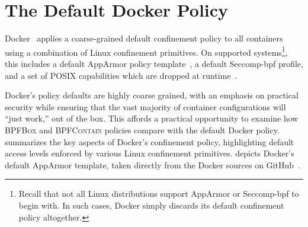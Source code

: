 \documentclass[
  fontsize=12pt,
  titlepage=firstiscover,
  paper=letter,
oneside,
  cleardoublepage=plain,
  parskip=half-,
  DIV=10,
  parindent,
  appendixprefix,
  chapterprefix,
  listof=totoc,
]{scrbook}
\newcommand{\bpfbox}{\textsc{BPFBox}}
\newcommand{\bpfcontain}{\textsc{BPFContain}}
\begin{document}
\section{The Default Docker Policy}

Docker~\cite{docker_security} applies a coarse-grained default confinement policy to all
containers using a combination of Linux confinement primitives. On supported
systems\footnote{Recall that not all Linux distributions support AppArmor or Seccomp-bpf
to begin with. In such cases, Docker simply discards its default confinement policy
altogether.}, this includes a default AppArmor policy template~\cite{docker_apparmor,
docker_default_apparmor}, a default Seccomp-bpf profile, and a set of POSIX capabilities
which are dropped at runtime~\cite{docker_security}.

Docker's policy defaults are highly coarse grained, with an emphasis on practical security
while ensuring that the vast majority of container configurations will \enquote{just
work,} out of the box. This affords a practical opportunity to examine how \bpfbox{} and
\bpfcontain{} policies compare with the default Docker policy. 
summarizes the key aspects of Docker's confinement policy, highlighting default access
levels enforced by various Linux confinement primitives.  depicts
Docker's default AppArmor template, taken directly from the Docker sources on
GitHub~\cite{docker_default_apparmor}.
\end{document}
